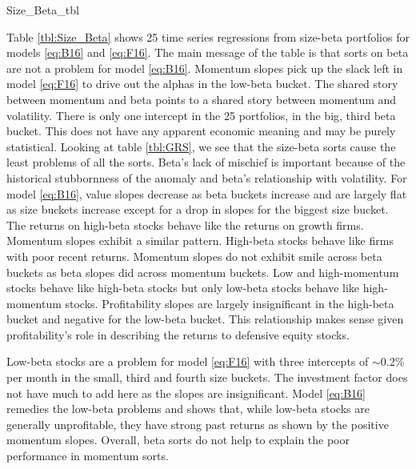 
{Size_Beta_tbl}

Table \ref{tbl:Size_Beta} shows 25 time series regressions from size-beta
portfolios for models \ref{eq:B16} and \ref{eq:F16}. The main message of the
table is that sorts on beta are not a problem for model \ref{eq:B16}. Momentum
slopes pick up the slack left in model \ref{eq:F16} to drive out the alphas in
the low-beta bucket. The shared story between momentum and beta points to a
shared story between momentum and volatility. There is only one intercept in
the 25 portfolios, in the big, third beta bucket. This does not have any
apparent economic meaning and may be purely statistical. Looking at table
\ref{tbl:GRS}, we see that the size-beta sorts cause the least problems of all
the sorts. Beta's lack of mischief is important because of the historical
stubbornness of the anomaly \parencite{jensen1972capital}
and beta's relationship with volatility.
For model \ref{eq:B16}, value slopes decrease as beta buckets increase and are
largely flat as size buckets increase except for a drop in slopes for the
biggest size bucket.
The returns on high-beta stocks behave like the returns on growth firms.
Momentum slopes exhibit a similar pattern.
High-beta stocks behave like firms with poor recent returns.
Momentum slopes do not exhibit smile across beta buckets as beta slopes did
across momentum buckets.
Low and high-momentum stocks behave like high-beta stocks but only low-beta
stocks behave like high-momentum stocks.
Profitability slopes are largely insignificant in the high-beta bucket and
negative for the low-beta bucket.
This relationship makes sense given profitability's role in describing the
returns to defensive equity stocks.

Low-beta stocks are a problem for model \ref{eq:F16} with three intercepts of
$\sim$0.2\% per month in the small, third and fourth size buckets.
The investment factor does not have much to add here as the slopes are
insignificant.
Model \ref{eq:B16} remedies the low-beta problems and shows that, while
low-beta stocks are generally unprofitable, they have strong past returns as
shown by the positive momentum slopes.
Overall, beta sorts do not help to explain the poor performance in momentum
sorts.

